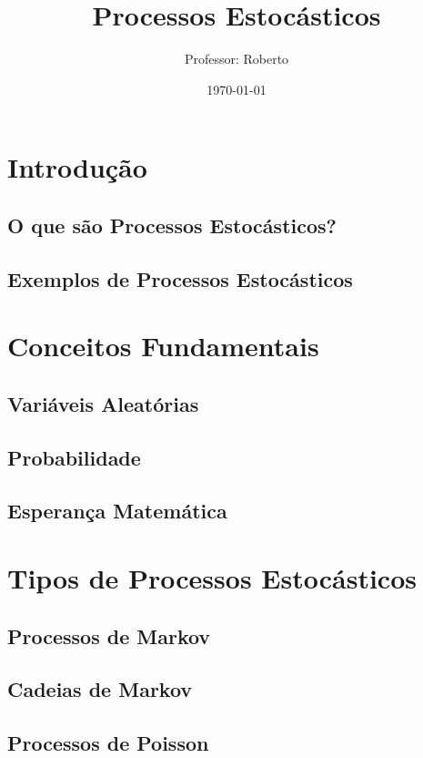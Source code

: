\documentclass[12pt, a4paper]{article}
\title{Processos Estocásticos}
\author{Professor: Roberto}
\date{\today}
\begin{document}
\maketitle

\section{Introdução}

\subsection{O que são Processos Estocásticos?}

\subsection{Exemplos de Processos Estocásticos}

\section{Conceitos Fundamentais}

\subsection{Variáveis Aleatórias}

\subsection{Probabilidade}

\subsection{Esperança Matemática}

\section{Tipos de Processos Estocásticos}

\subsection{Processos de Markov}

\subsection{Cadeias de Markov}

\subsection{Processos de Poisson}
\end{document}
